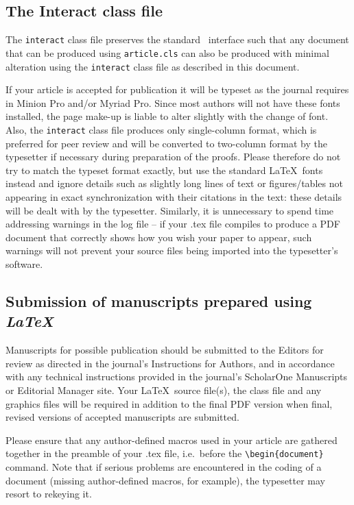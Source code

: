 \documentclass[]{interact}
\theoremstyle{plain}%
\theoremstyle{definition}
\theoremstyle{remark}
\begin{document}
\subsection{The \textsf{Interact} class file}\label{class}

The \texttt{interact} class file preserves the standard \LaTeXe\ interface such that any document that can be produced using \texttt{article.cls} can also be produced with minimal alteration using the \texttt{interact} class file as described in this document.

If your article is accepted for publication it will be typeset as the journal requires in Minion Pro and/or Myriad Pro. Since most authors will not have these fonts installed, the page make-up is liable to alter slightly with the change of font. Also, the \texttt{interact} class file produces only single-column format, which is preferred for peer review and will be converted to two-column format by the typesetter if necessary during preparation of the proofs. Please therefore do not try to match the typeset format exactly, but use the standard \LaTeX\ fonts instead and ignore details such as slightly long lines of text or figures/tables not appearing in exact synchronization with their citations in the text: these details will be dealt with by the typesetter. Similarly, it is unnecessary to spend time addressing warnings in the log file -- if your .tex file compiles to produce a PDF document that correctly shows how you wish your paper to appear, such warnings will not prevent your source files being imported into the typesetter's software.


\subsection{Submission of manuscripts prepared using \emph{\LaTeX}}

Manuscripts for possible publication should be submitted to the Editors for review as directed in the journal's Instructions for Authors, and in accordance with any technical instructions provided in the journal's ScholarOne Manuscripts or Editorial Manager site. Your \LaTeX\ source file(s), the class file and any graphics files will be required in addition to the final PDF version when final, revised versions of accepted manuscripts are submitted.

Please ensure that any author-defined macros used in your article are gathered together in the preamble of your .tex file, i.e.\ before the \verb"\begin{document}" command. Note that if serious problems are encountered in the coding of a document (missing author-defined macros, for example), the typesetter may resort to rekeying it.
\end{document}
